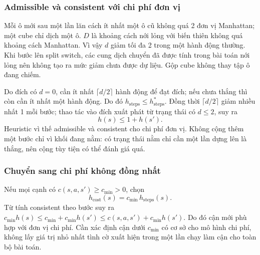 \documentclass[a4paper]{article}
\begin{document}
\subsubsection{Admissible và consistent với chi phí đơn vị}
Mỗi ô mới sau một lần lăn cách ít nhất một ô cũ không quá 2 đơn vị Manhattan; một cube chỉ dịch một ô. $D$ là khoảng cách nới lỏng với biến thiên không quá khoảng cách Manhattan. Vì vậy $d$ giảm tối đa 2 trong một hành động thường. Khi bước lên split switch, các cung dịch chuyển đã được tính trong bài toán nới lỏng nên không tạo ra mức giảm chưa được dự liệu. Gộp cube không thay tập ô đang chiếm.

Do đích có $d=0$, cần ít nhất $\lceil d/2\rceil$ hành động để đạt đích; nếu chưa thắng thì còn cần ít nhất một hành động. Do đó $h_{\mathrm{steps}}\le h^*_{\mathrm{steps}}$. Đồng thời $\lceil d/2\rceil$ giảm nhiều nhất 1 mỗi bước; thao tác vào đích xuất phát từ trạng thái có $d\le2$, suy ra
\begin{equation}
h(s)\le1+h(s').
\end{equation}
Heuristic vì thế admissible và consistent cho chi phí đơn vị. Không cộng thêm một bước chỉ vì khối đang nằm: có trạng thái nằm chỉ cần một lần dựng lên là thắng, nên cộng tùy tiện có thể đánh giá quá.

\subsubsection{Chuyển sang chi phí không đồng nhất}
Nếu mọi cạnh có $c(s,a,s')\ge c_{\min}>0$, chọn
\begin{equation}\label{eq:scaled}
h_{\mathrm{cost}}(s)=c_{\min}\,h_{\mathrm{steps}}(s).
\end{equation}
Từ tính consistent theo bước suy ra $c_{\min}h(s)\le c_{\min}+c_{\min}h(s')\le c(s,a,s')+c_{\min}h(s')$. Do đó cận mới phù hợp với đơn vị chi phí. Cần xác định cận dưới \(c_{\min}\) có cơ sở cho mô hình chi phí, không lấy giá trị nhỏ nhất tình cờ xuất hiện trong một lần chạy làm cận cho toàn bộ bài toán.



\end{document}
